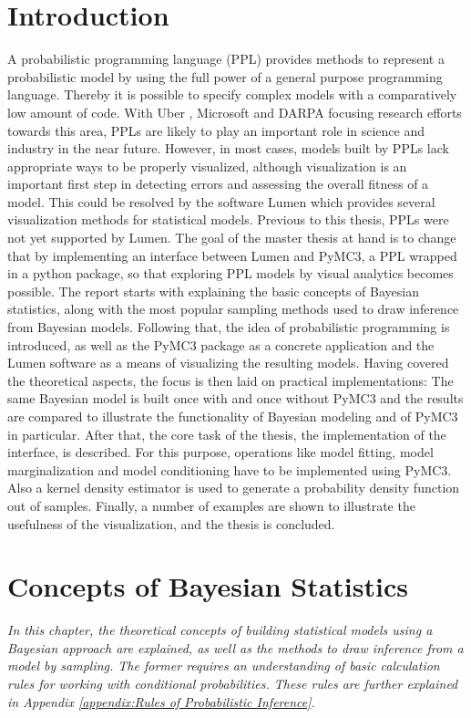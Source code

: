 \documentclass{article}
\begin{document}
\section{Introduction}
A probabilistic programming language (PPL) provides methods to represent a probabilistic model by using the full power of a general purpose programming language. Thereby it is possible to specify complex models with a comparatively low amount of code. With Uber \cite{bingham2018pyro}, Microsoft \cite{gordon2014probabilistic} and DARPA \cite{Hardesty2015} focusing research efforts towards this area, PPLs are likely to play an important role in science and industry in the near future.
However, in most cases, models built by PPLs lack appropriate ways to be properly visualized, although visualization is an important first step in detecting errors and assessing the overall fitness of a model. This could be resolved by the software Lumen which provides several visualization methods for statistical models. Previous to this thesis, PPLs were not yet supported by Lumen. The goal of the master thesis at hand is to change that by implementing an interface between Lumen and PyMC3, a PPL wrapped in a python package, so that exploring PPL models by visual analytics becomes possible. The report starts with explaining the basic concepts of Bayesian statistics, along with the most popular sampling methods used to draw inference from Bayesian models. Following that, the idea of probabilistic programming is introduced, as well as the PyMC3 package as a concrete application and the Lumen software as a means of visualizing the resulting models. Having covered the theoretical aspects, the focus is then laid on practical implementations: The same Bayesian model is built once with and once without PyMC3 and the results are compared to illustrate the functionality of Bayesian modeling and of PyMC3 in particular. After that, the core task of the thesis, the implementation of the interface, is described. For this purpose, operations like model fitting, model marginalization and model conditioning have to be implemented using PyMC3. Also a kernel density estimator is used to generate a probability density function out of samples. Finally, a number of examples are shown to illustrate the usefulness of the visualization, and the thesis is concluded.
\section{Concepts of Bayesian Statistics}
\textit{In this chapter, the theoretical concepts of building statistical models using a Bayesian approach are explained, as well as the methods to draw inference from a model by sampling. The former requires an understanding of basic calculation rules for working with conditional probabilities. These rules are further explained in Appendix \autoref{appendix:Rules of Probabilistic Inference}.}
\end{document}
